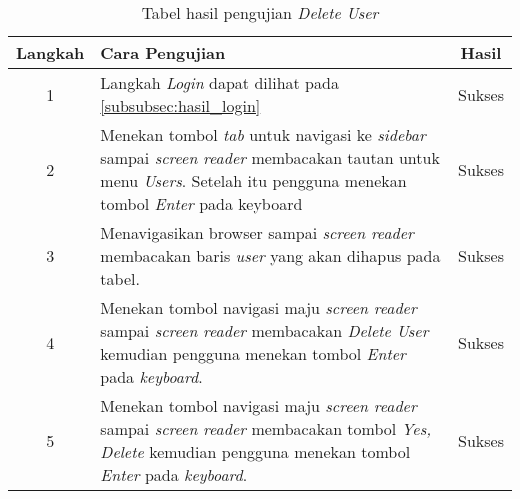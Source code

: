 \begin{table}[H]
	\centering
	\caption{Tabel hasil pengujian \textit{Delete User}}
	\label{tab:hasil_delete_user}
	\begin{tabular}{|c|p{12cm}|c|}
		\toprule
		Langkah & Cara Pengujian & Hasil \\
		\midrule
		1 & Langkah \textit{Login} dapat dilihat pada \ref{subsubsec:hasil_login} & Sukses\\
		2 & Menekan tombol \textit{tab} untuk navigasi ke \textit{sidebar} sampai \textit{screen reader} membacakan tautan untuk menu \textit{Users}. Setelah itu pengguna menekan tombol \textit{Enter} pada keyboard & Sukses\\
		3 & Menavigasikan browser sampai \textit{screen reader} membacakan baris \textit{user} yang akan dihapus pada tabel. & Sukses\\
		4 & Menekan tombol navigasi maju \textit{screen reader} sampai \textit{screen reader} membacakan \textit{Delete User} kemudian pengguna menekan tombol \textit{Enter} pada \textit{keyboard}. & Sukses\\
		5 & Menekan tombol navigasi maju \textit{screen reader} sampai \textit{screen reader} membacakan tombol \textit{Yes, Delete} kemudian pengguna menekan tombol \textit{Enter} pada \textit{keyboard}. & Sukses\\
		\bottomrule
	\end{tabular}
\end{table}